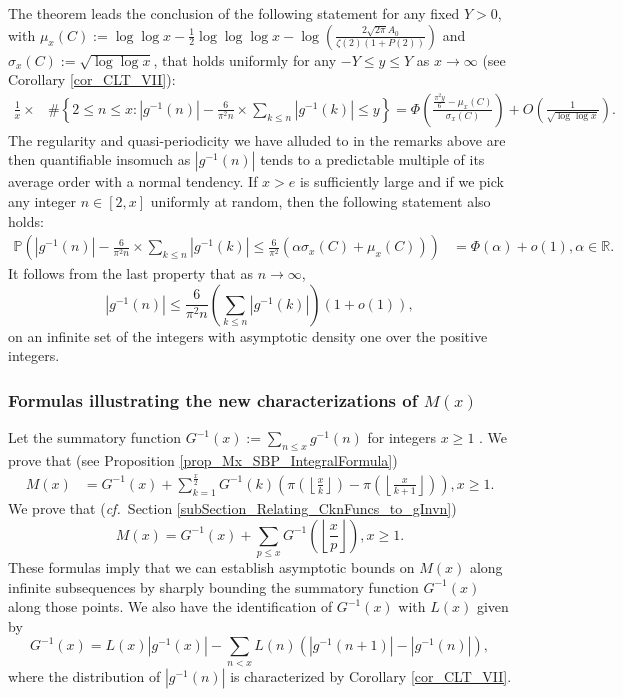 \documentclass[11pt,reqno,a4letter]{article}
\numberwithin{figure}{section}
\numberwithin{table}{section}
\newcommand{\cf}{\textit{cf.\ }}
\newcommand{\seqnum}[1]{\href{http://oeis.org/#1}{\color{ProcessBlue}{\underline{#1}}}}
\newcommand{\Floor}[2]{\ensuremath{\left\lfloor \frac{#1}{#2} \right\rfloor}}
\theoremstyle{plain}
\numberwithin{theorem}{section}
\theoremstyle{definition}
\begin{document}
The theorem leads the conclusion of the following statement for any fixed $Y > 0$, with 
$\mu_x(C) := \log\log x - \frac{1}{2}\log\log\log x - 
 \log\left(\frac{2\sqrt{2\pi}A_0}{\zeta(2)(1+P(2))}\right)$ and 
$\sigma_x(C) := \sqrt{\log\log x}$, 
that holds uniformly for any $-Y \leq y \leq Y$ 
as $x \rightarrow \infty$ (see Corollary \ref{cor_CLT_VII}): 
\begin{align*}
\frac{1}{x} \times & \#\left\{2 \leq n \leq x:|g^{-1}(n)| - 
     \frac{6}{\pi^2 n} \times \sum_{k \leq n} |g^{-1}(k)| \leq y\right\} = 
     \Phi\left(\frac{\frac{\pi^2 y}{6}-\mu_x(C)}{\sigma_x(C)}\right) + 
     O\left(\frac{1}{\sqrt{\log\log x}}\right). 
\end{align*}
The regularity and quasi-periodicity we have alluded 
to in the remarks above are then 
quantifiable insomuch as $|g^{-1}(n)|$ 
tends to a predictable multiple of 
its average order with a normal tendency. 
If $x > e$ is sufficiently large and 
if we pick any integer $n \in [2, x]$ uniformly at random, then 
the following statement also holds: 
\begin{align*} 
\tag{D} 
\mathbb{P}\left(|g^{-1}(n)| - \frac{6}{\pi^2 n} \times \sum_{k \leq n} |g^{-1}(k)| \leq 
     \frac{6}{\pi^2}\left(\alpha \sigma_x(C) + \mu_x(C)\right)
     \right) & = 
     \Phi\left(\alpha\right) + o(1), \alpha \in \mathbb{R}. 
\end{align*} 
It follows from the last property that as $n \rightarrow \infty$, 
$$|g^{-1}(n)| \leq \frac{6}{\pi^2 n} \left(\sum_{k \leq n} |g^{-1}(k)|\right)(1+o(1)),$$
on an infinite set of the integers with asymptotic density one over the 
positive integers. 

\subsubsection{Formulas illustrating the new characterizations of $M(x)$} 

Let the summatory function 
$G^{-1}(x) := \sum_{n \leq x} g^{-1}(n)$ for integers $x \geq 1$ 
\cite[\seqnum{A341472}]{OEIS}. 
We prove that (see Proposition \ref{prop_Mx_SBP_IntegralFormula}) 
\begin{align} 
\label{eqn_Mx_gInvnPixk_formula_v2} 
M(x) & = G^{-1}(x) + 
     \sum_{k=1}^{\frac{x}{2}} G^{-1}(k) \left( 
     \pi\left(\Floor{x}{k}\right) - \pi\left(\Floor{x}{k+1}\right) 
     \right), x \geq 1. 
\end{align} 
We prove that (\cf Section \ref{subSection_Relating_CknFuncs_to_gInvn}) 
\[
M(x) = G^{-1}(x) + \sum_{p \leq x} G^{-1}\left(\Floor{x}{p}\right), x \geq 1. 
\]
These formulas 
imply that we can establish asymptotic bounds on 
$M(x)$ along infinite subsequences
by sharply bounding the summatory function $G^{-1}(x)$ along those points. 
We also have the identification of $G^{-1}(x)$ with $L(x)$ given by 
\[
G^{-1}(x) 
     = L(x)|g^{-1}(x)| - \sum_{n < x} 
     L(n) \left(|g^{-1}(n+1)| - |g^{-1}(n)|\right), 
\]
where the distribution of $|g^{-1}(n)|$ is characterized by 
Corollary \ref{cor_CLT_VII}. 
\end{document}
